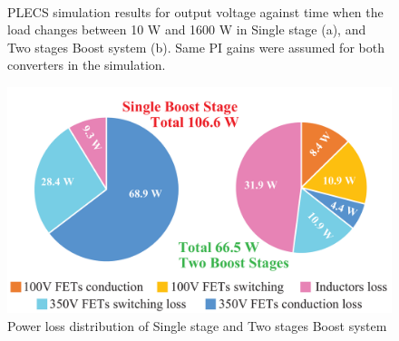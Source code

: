     \begin{figure}
    \centering
    \\
    \caption{PLECS simulation results for output voltage against time when the load changes between 10 W and 1600 W in Single stage (a), and Two stages Boost system  (b). Same PI gains were assumed for both converters in the simulation.}
    \end{figure}
    
    \begin{figure}
      \centering
      \includegraphics[width=4.5in]{appA/images/Loss_plot_v5.pdf}
      \caption{Power loss distribution of Single stage and Two stages Boost system }
      \label{fig:loss_plot}
    \end{figure}
    
